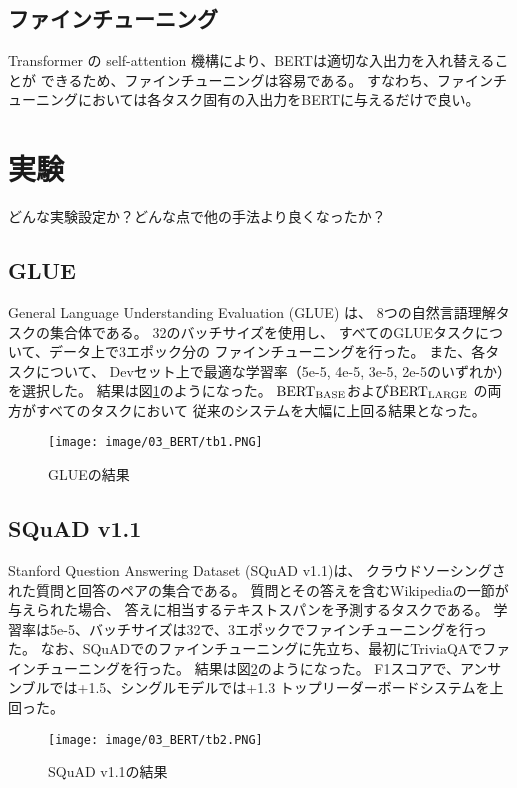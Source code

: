 \documentclass{jsarticle}
\begin{document}
\subsection{ファインチューニング}
Transformer の self-attention 機構により、BERTは適切な入出力を入れ替えることが
できるため、ファインチューニングは容易である。
すなわち、ファインチューニングにおいては各タスク固有の入出力をBERTに与えるだけで良い。

\section{実験}
どんな実験設定か？どんな点で他の手法より良くなったか？

\subsection{GLUE}
General Language Understanding Evaluation (GLUE) は、
8つの自然言語理解タスクの集合体である。
32のバッチサイズを使用し、
すべてのGLUEタスクについて、データ上で3エポック分の
ファインチューニングを行った。
また、各タスクについて、
Devセット上で最適な学習率（5e-5, 4e-5, 3e-5, 2e-5のいずれか）
を選択した。
結果は図\ref{fig:tb1}のようになった。
$\rm BERT_{BASE}$および$\rm BERT_{LARGE}$ の両方がすべてのタスクにおいて
従来のシステムを大幅に上回る結果となった。

\begin{figure}[H]
  \begin{center}
    \texttt{[image: image/03\_BERT/tb1.PNG]}
    \caption{GLUEの結果}
    \label{fig:tb1}
  \end{center}
\end{figure}


\subsection{SQuAD v1.1}
Stanford Question Answering Dataset (SQuAD v1.1)は、
クラウドソーシングされた質問と回答のペアの集合である。
質問とその答えを含むWikipediaの一節が与えられた場合、
答えに相当するテキストスパンを予測するタスクである。
学習率は5e-5、バッチサイズは32で、3エポックでファインチューニングを行った。
なお、SQuADでのファインチューニングに先立ち、最初にTriviaQAでファインチューニングを行った。
結果は図\ref{fig:tb2}のようになった。
F1スコアで、アンサンブルでは+1.5、シングルモデルでは+1.3
トップリーダーボードシステムを上回った。

\begin{figure}[H]
  \begin{center}
    \texttt{[image: image/03\_BERT/tb2.PNG]}
    \caption{SQuAD v1.1の結果}
    \label{fig:tb2}
  \end{center}
\end{figure}
\end{document}
